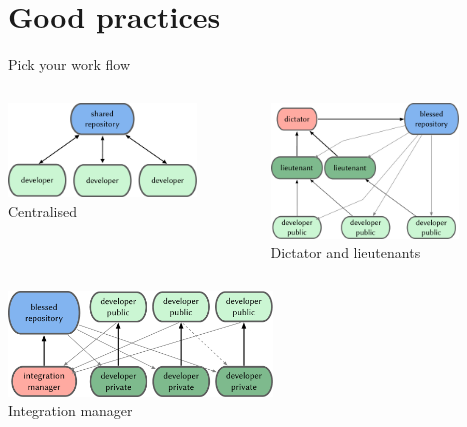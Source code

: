 \documentclass{beamer}
\begin{document}
\section{Good practices}


\begin{frame}{Pick your work flow}
  \begin{columns}[c]
    \begin{column}{5cm}
      \begin{center}
        \includegraphics[width=5cm]{images/fig0501.pdf}\\Centralised
      \end{center}
    \end{column}
    \begin{column}{6cm}
      \begin{center}
        \includegraphics[width=5cm]{images/fig0503.pdf}\\Dictator and lieutenants
      \end{center}
    \end{column}
  \end{columns}
  \begin{columns}[c]
    \begin{column}{8cm}
      \begin{center}
        \includegraphics[width=7cm]{images/fig0502.pdf}\\Integration manager
      \end{center}
    \end{column}
  \end{columns}
\end{frame}
\end{document}
